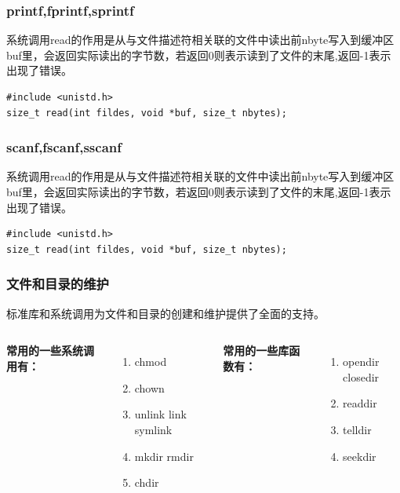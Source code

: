 \documentclass{beamer}
\begin{document}
\begin{frame}[fragile]
\frametitle{printf,fprintf,sprintf}
系统调用read的作用是从与文件描述符相关联的文件中读出前nbyte写入到缓冲区buf里，会返回实际读出的字节数，若返回0则表示读到了文件的末尾,返回-1表示出现了错误。
\begin{example}[read系统调用的原型]
\begin{verbatim}
#include <unistd.h>
size_t read(int fildes, void *buf, size_t nbytes);
\end{verbatim}
\end{example}

\end{frame}
\begin{frame}[fragile]
\frametitle{scanf,fscanf,sscanf}
系统调用read的作用是从与文件描述符相关联的文件中读出前nbyte写入到缓冲区buf里，会返回实际读出的字节数，若返回0则表示读到了文件的末尾,返回-1表示出现了错误。
\begin{example}[read系统调用的原型]
\begin{verbatim}
#include <unistd.h>
size_t read(int fildes, void *buf, size_t nbytes);
\end{verbatim}
\end{example}

\end{frame}

\begin{frame}
\frametitle{文件和目录的维护}
标准库和系统调用为文件和目录的创建和维护提供了全面的支持。
\begin{columns}


\textbf{常用的一些系统调用有：}
\begin{enumerate}
\item
chmod
\item
chown
\item
unlink	 link 		symlink
\item
mkdir	rmdir
\item
chdir
\end{enumerate}

\textbf{常用的一些库函数有：}
\begin{enumerate}
\item
opendir	closedir
\item
readdir
\item
telldir
\item
seekdir
\end{enumerate}
\end{columns}
\end{frame}
\end{document}
